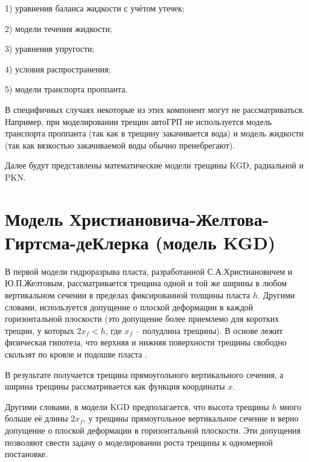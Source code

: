 1) уравнения баланса жидкости с учётом утечек;

2) модели течения жидкости;

3) уравнения упругости;

4) условия распространения;

5) модели транспорта проппанта.

В специфичных случаях некоторые из этих компонент могут не рассматриваться.
Например, при моделировании трещин автоГРП не используется модель транспорта проппанта (так как в трещину закачивается вода) и модель жидкости (так как вязкостью закачиваемой воды обычно пренебрегают).

Далее будут представлены математические модели трещины KGD, радиальной и PKN.

\section{Модель Христиановича-Желтова-Гиртсма-деКлерка (модель KGD)}
\vspace*{-5mm}

В первой модели гидроразрыва пласта, разработанной С.А.Христиановичем и Ю.П.Желтовым, рассматривается трещина одной и той же ширины в любом вертикальном сечении в пределах фиксированной толщины пласта $h$. 
Другими словами, используется допущение о плоской деформации в каждой горизонтальной плоскости (это допущение более приемлемо для коротких трещин, у которых $2x_{\!f}<h$, где $x_{\!f}$ -- полудлина трещины).
В основе лежит физическая гипотеза, что верхняя и нижняя поверхности трещины свободно скользят по кровле и подошве пласта \cite{economides}.

В результате получается трещина прямоугольного вертикального сечения, а ширина трещины рассматривается как функция координаты $x$.

Другими словами, в модели KGD предполагается, что высота трещины $h$ много больше её длины $2x_{\!f}$, у трещины прямоугольное вертикальное сечение и верно допущение о плоской деформации в горизонтальной плоскости.
Эти допущения позволяют свести задачу о моделировании роста трещины к одномерной постановке.


